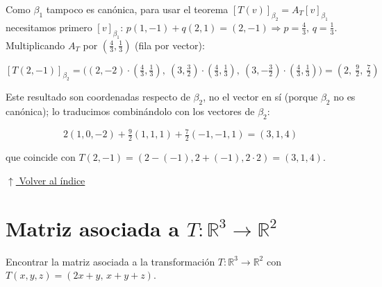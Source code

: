 \documentclass[12pt]{article}
\newcommand{\volverindice}{%
    \vspace{1em}%
    \begin{flushright}%
        \hyperlink{indice}{\small $\uparrow$ Volver al índice}%
    \end{flushright}%
}
\begin{document}
\begin{enumerate}[label=\alph*.-]
    Como $\beta_1$ tampoco es canónica, para usar el teorema
    $[T(v)]_{\beta_2}=A_T[v]_{\beta_1}$ necesitamos primero
    $[v]_{\beta_1}$: $p(1,-1)+q(2,1)=(2,-1)\Rightarrow
    p=\tfrac43,\,q=\tfrac13$. Multiplicando $A_T$ por
    $(\tfrac43,\tfrac13)$ (fila por vector):

    \[
    [T(2,-1)]_{\beta_2}=\Big((2,-2)\cdot(\tfrac43,\tfrac13),\
    (3,\tfrac32)\cdot(\tfrac43,\tfrac13),\
    (3,-\tfrac32)\cdot(\tfrac43,\tfrac13)\Big)
    =\left(2,\ \tfrac92,\ \tfrac72\right)
    \]

    Este resultado son coordenadas respecto de $\beta_2$, no el
    vector en sí (porque $\beta_2$ no es canónica); lo traducimos
    combinándolo con los vectores de $\beta_2$:

    \[
    \boxed{2(1,0,-2)+\tfrac92(1,1,1)+\tfrac72(-1,-1,1)=(3,1,4)}
    \]

    que coincide con $T(2,-1)=(2-(-1),2+(-1),2\cdot2)=(3,1,4)$.
    \checkmark

\end{enumerate}

\volverindice
\newpage


\section{Matriz asociada a \texorpdfstring{$T:\mathbb{R}^3\to\mathbb{R}^2$}{T}}

Encontrar la matriz asociada a la transformación
$T:\mathbb{R}^3\to\mathbb{R}^2$ con $T(x,y,z)=(2x+y,\,x+y+z)$.
\end{document}
